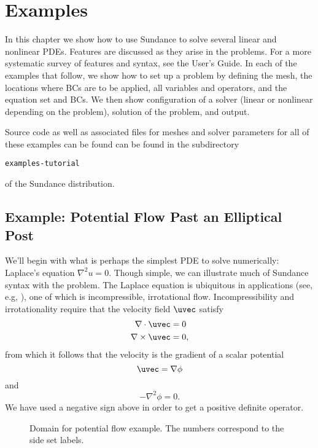 \chapter{Examples}

In this chapter we show how to use Sundance to solve several linear and
nonlinear PDEs. Features are discussed as they arise in the problems.
For a more systematic survey of features and syntax, see the User's Guide.
In each of the examples that follow, we show how to set up a problem
by defining the mesh,
the locations where BCs are to be applied, all variables and operators,
and the equation set and BCs. We then show configuration of a solver
(linear or nonlinear depending on the problem), solution of the problem,
and output. 

Source code as well as associated files for meshes and solver parameters
for all of these examples can be found can be found in the subdirectory
\begin{verbatim}
examples-tutorial
\end{verbatim}
of the Sundance distribution.


\section{Example: Potential Flow Past an Elliptical Post}
\label{PotentialFlowExample}
We'll begin with what is perhaps the simplest PDE to solve numerically: 
Laplace's equation $\nabla^2 u = 0$. Though simple, we can illustrate much of
Sundance syntax with the problem. The Laplace equation is ubiquitous in
applications (see, e.g, \cite{FeynmanII}), one of which is incompressible, 
irrotational flow. Incompressibility and
irrotationality require that the velocity field $\uvec$ satisfy 
\begin{eqnarray}
\nabla\cdot\uvec&=0\\
\nabla\times\uvec&=0,
\end{eqnarray}
from which it follows that the velocity is the gradient of a scalar
potential
\begin{equation}
\uvec=\nabla\phi
\end{equation}
and
\begin{equation}
-\nabla^2\phi = 0.
\end{equation}
We have used a negative sign above in order to get 
a positive definite operator.

\begin{figure}[p]
\caption{Domain for potential flow example. The numbers correspond to the side
set labels.}
\label{PostGeom}
\end{figure}

